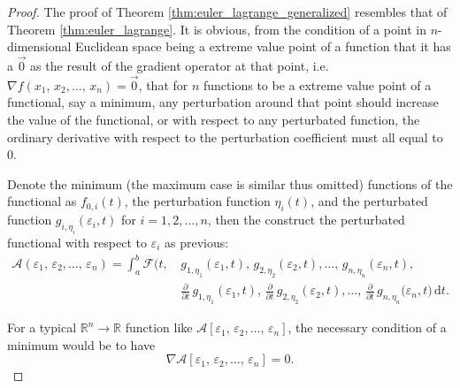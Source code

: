 \documentclass[12pt,a4paper]{article}
\begin{document}
\begin{proof}
The proof of Theorem \ref{thm:euler_lagrange_generalized} resembles that of Theorem \ref{thm:euler_lagrange}. It is obvious, from the condition of a point in $n$-dimensional Euclidean space being a extreme value point of a function that it has a $\vec{0}$ as the result of the gradient operator at that point, i.e. $\nabla f(x_1,\,x_2,\dots,\,x_n)=\vec{0}$, that for $n$ functions to be a extreme value point of a functional, say a minimum, any perturbation around that point should increase the value of the functional, or with respect to any perturbated function, the ordinary derivative with respect to the perturbation coefficient must all equal to $0$.

Denote the minimum (the maximum case is similar thus omitted) functions of the functional as $f_{0,i}(t)$, the perturbation function $\eta_i(t)$, and the perturbated function $g_{i,\eta_i}(\varepsilon_i,t)$ for $i=1,2,\dots,n$, then the construct the perturbated functional with respect to $\varepsilon_i$ as previous:
\begin{align*}
\mathcal{A}(\varepsilon_1,\,\varepsilon_2,\dots,\,\varepsilon_n)=\int_a^b\mathcal{F}\biggl(t,\,&g_{1,\eta_1}(\varepsilon_1,t),\,g_{2,\eta_2}(\varepsilon_2,t),\dots,\,g_{n,\eta_n}(\varepsilon_n,t),\\
&\frac{\partial}{\partial t}\,g_{1,\eta_1}(\varepsilon_1,t),\,\frac{\partial}{\partial t}\,g_{2,\eta_2}(\varepsilon_2,t),\dots,\,\frac{\partial}{\partial t}\,g_{n,\eta_n}(\varepsilon_n,t\biggr)\,\mathrm{d}t.
\end{align*}

For a typical $\mathbb{R}^n\to\mathbb{R}$ function like $\mathcal{A}[\varepsilon_1,\,\varepsilon_2,\dots,\,\varepsilon_n]$, the necessary condition of a minimum would be to have
\[
\nabla\mathcal{A}[\varepsilon_1,\,\varepsilon_2,\dots,\,\varepsilon_n]=0.
\]


\end{proof}
\end{document}
